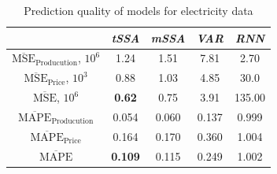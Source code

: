 \documentclass[referee, pdflatex]{sn-jnl}
\theoremstyle{definition}
\theoremstyle{plain}
\begin{document}
	\def\arraystretch{1.1}
	\begin{table}[h]
		\centering
		\caption{Prediction quality of models for electricity data}\label{tab:pred_res_electr}
		\begin{tabular}{|c|c|c|c|c|}
			\hline
			& \textit{tSSA}  & \textit{mSSA} & \textit{VAR} & \textit{RNN} \\ \hline
			$ \overline{\text{MSE}}_{\text{Producution}} $, $10^6$ & 1.24           & 1.51          & 7.81         & 2.70         \\ \hline
			$ \overline{\text{MSE}}_{\text{Price}} $, $10^3$      & 0.88           & 1.03          & 4.85         & 30.0         \\ \hline
			$ \overline{\text{MSE}} $, $10^6$             & \textbf{0.62}  & 0.75          & 3.91         & 135.00       \\ \hline
			$ \overline{\text{MAPE}}_{\text{Producution}} $        & 0.054          & 0.060         & 0.137        & 0.999        \\ \hline
			$ \overline{\text{MAPE}}_{\text{Price}} $             & 0.164          & 0.170         & 0.360        & 1.004        \\ \hline
			$ \overline{\text{MAPE}} $                    & \textbf{0.109} & 0.115         & 0.249        & 1.002        \\ \hline
		\end{tabular}
	\end{table}
	
\end{document}
